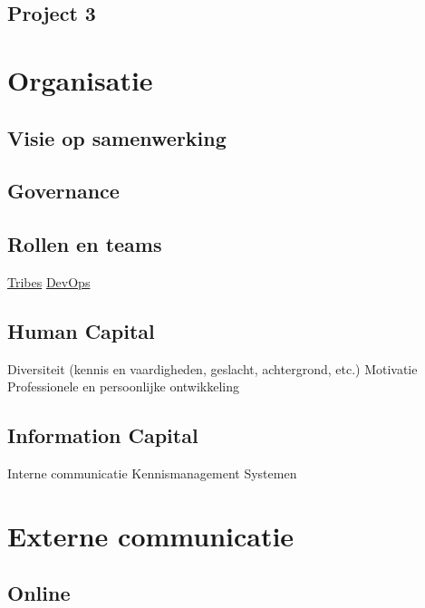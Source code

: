 \documentclass[]{book}
\begin{document}
\section{Project 3}\label{project-3}

\chapter{Organisatie}\label{organisatie}

\section{Visie op samenwerking}\label{visie-op-samenwerking}

\section{Governance}\label{governance}

\section{Rollen en teams}\label{rollen-en-teams}

\href{https://techbeacon.com/teams-tribes-creating-one-team-culture-devops}{Tribes}
\href{https://en.wikipedia.org/wiki/DevOps}{DevOps}

\section{Human Capital}\label{human-capital}

Diversiteit (kennis en vaardigheden, geslacht, achtergrond, etc.)
Motivatie Professionele en persoonlijke ontwikkeling

\section{Information Capital}\label{information-capital}

Interne communicatie Kennismanagement Systemen

\chapter{Externe communicatie}\label{externe-communicatie}

\section{Online}\label{online}
\end{document}
